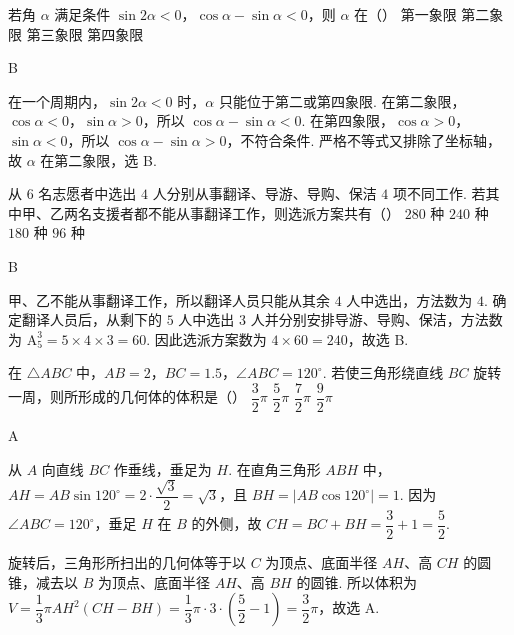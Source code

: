 \begin{problem}
若角 \(\alpha\) 满足条件 \(\sin2\alpha<0\)，\(\cos\alpha-\sin\alpha<0\)，则 \(\alpha\) 在（\quad）
\choices
    {第一象限}
    {第二象限}
    {第三象限}
    {第四象限}
\end{problem}

\begin{answer}
B
\end{answer}

\begin{solution}
在一个周期内，\(\sin2\alpha<0\) 时，\(\alpha\) 只能位于第二或第四象限. 在第二象限，\(\cos\alpha<0\)，\(\sin\alpha>0\)，所以 \(\cos\alpha-\sin\alpha<0\). 在第四象限，\(\cos\alpha>0\)，\(\sin\alpha<0\)，所以 \(\cos\alpha-\sin\alpha>0\)，不符合条件. 严格不等式又排除了坐标轴，故 \(\alpha\) 在第二象限，选 B.
\end{solution}

\begin{problem}
从 \(6\) 名志愿者中选出 \(4\) 人分别从事翻译、导游、导购、保洁 \(4\) 项不同工作. 若其中甲、乙两名支援者都不能从事翻译工作，则选派方案共有（\quad）
\choices
    {\(280\) 种}
    {\(240\) 种}
    {\(180\) 种}
    {\(96\) 种}

\end{problem}

\begin{answer}
B
\end{answer}

\begin{solution}
甲、乙不能从事翻译工作，所以翻译人员只能从其余 \(4\) 人中选出，方法数为 \(4\). 确定翻译人员后，从剩下的 \(5\) 人中选出 \(3\) 人并分别安排导游、导购、保洁，方法数为 \(\mathrm A_{5}^{3}=5\times4\times3=60\). 因此选派方案数为 \(4\times60=240\)，故选 B.
\end{solution}

\begin{problem}
在 \(\triangle ABC\) 中，\(AB=2\)，\(BC=1.5\)，\(\angle ABC=120^{\circ}\). 若使三角形绕直线 \(BC\) 旋转一周，则所形成的几何体的体积是（\quad）
\choices
    {\(\dfrac{3}{2}\pi\)}
    {\(\dfrac{5}{2}\pi\)}
    {\(\dfrac{7}{2}\pi\)}
    {\(\dfrac{9}{2}\pi\)}

\end{problem}

\begin{answer}
A
\end{answer}

\begin{solution}
从 \(A\) 向直线 \(BC\) 作垂线，垂足为 \(H\). 在直角三角形 \(ABH\) 中，
\(AH=AB\sin120^{\circ}=2\cdot\dfrac{\sqrt{3}}{2}=\sqrt{3}\)，且 \(BH=\lvert AB\cos120^{\circ}\rvert=1\). 因为 \(\angle ABC=120^{\circ}\)，垂足 \(H\) 在 \(B\) 的外侧，故 \(CH=BC+BH=\dfrac{3}{2}+1=\dfrac{5}{2}\).

旋转后，三角形所扫出的几何体等于以 \(C\) 为顶点、底面半径 \(AH\)、高 \(CH\) 的圆锥，减去以 \(B\) 为顶点、底面半径 \(AH\)、高 \(BH\) 的圆锥. 所以体积为
\(V=\dfrac{1}{3}\pi AH^{2}(CH-BH)=\dfrac{1}{3}\pi\cdot3\cdot\left(\dfrac{5}{2}-1\right)=\dfrac{3}{2}\pi\)，故选 A.
\end{solution}

